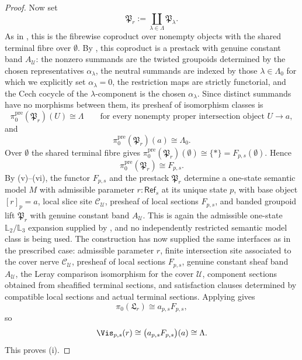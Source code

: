 \begin{proof}
Now set
\[
\mathfrak P_r:=\coprod_{\lambda\in\Lambda}\mathfrak P_\lambda.
\]
As in , this is the fibrewise
coproduct over nonempty objects with the shared terminal fibre over
$\emptyset$.
By , this coproduct is a prestack with genuine constant band $A_{\mathcal U}$: the nonzero summands are the twisted groupoids determined by the chosen representatives $\alpha_\lambda$, the neutral summands are indexed by those \(\lambda\in\Lambda_0\) for which we explicitly set \(\alpha_\lambda=0\), the restriction maps are strictly functorial, and the Cech cocycle of the $\lambda$-component is the chosen $\alpha_\lambda$. Since distinct summands have no morphisms between them, its presheaf of isomorphism classes is
\[
\pi_0^{\mathrm{pre}}(\mathfrak P_r)(U)\cong \Lambda
\qquad
\text{for every nonempty proper intersection object }U\to a,
\]
and
\[
\pi_0^{\mathrm{pre}}(\mathfrak P_r)(a)\cong \Lambda_0.
\]
Over $\emptyset$ the shared terminal fibre gives
$\pi_0^{\mathrm{pre}}(\mathfrak P_r)(\emptyset)\cong\{\ast\}=F_{p,s}(\emptyset)$.
Hence
\[
\pi_0^{\mathrm{pre}}(\mathfrak P_r)\cong F_{p,s}.
\]
By (v)--(vi), the functor
$F_{p,s}$ and the prestack $\mathfrak P_r$ determine a one-state semantic
model $M$ with admissible parameter $r:\mathsf{Ref}_s$ at its unique state $p$,
with base object $[r]_p=a$, local slice site $\mathcal C_{\mathcal U}$,
presheaf of local sections $F_{p,s}$, and banded groupoid lift $\mathfrak P_r$ with
genuine constant band $A_{\mathcal U}$. This is again the admissible one-state
$\mathbb L_2/\mathbb L_3$ expansion supplied by
, and no independently
restricted semantic model class is being used.
The construction has now supplied the same interfaces as in the prescribed case: admissible parameter $r$, finite intersection site associated to the cover nerve $\mathcal C_{\mathcal U}$, presheaf of local sections $F_{p,s}$, genuine constant sheaf band $A_{\mathcal U}$, the Leray comparison isomorphism for the cover $\mathcal U$, component sections obtained from sheafified terminal sections, and satisfaction clauses determined by compatible local sections and actual terminal sections.
Applying  gives
\[
\pi_0(\mathfrak L_r)\cong a_{p,s}F_{p,s},
\]
so
\[
\Vis_{p,s}(r)\cong \bigl(a_{p,s}F_{p,s}\bigr)(a)\cong \Lambda.
\]
This proves \textup{(i)}.


\end{proof}
